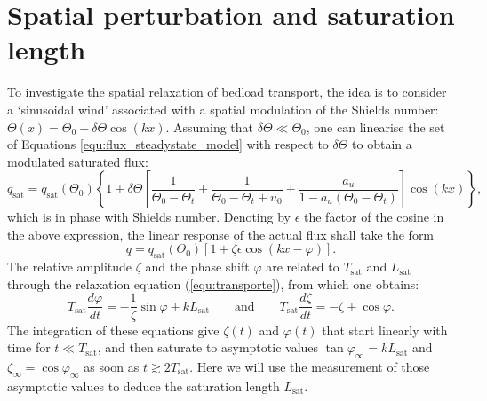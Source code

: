 \section{Spatial perturbation and saturation length}
\label{sec:Lsat}
    To investigate the spatial relaxation of bedload transport, the idea is to consider a `sinusoidal wind' associated with a spatial modulation of the Shields number: $\Theta(x) = \Theta_0 + \delta\Theta \cos (kx)$. Assuming that $\delta\Theta \ll \Theta_0$, one can linearise the set of Equations \ref{equ:flux_steadystate_model} with respect to $\delta\Theta$ to obtain a modulated saturated flux:
%
\begin{equation}
q_\textrm{sat} = q_\textrm{sat}(\Theta_0) \left\{ 1 + \delta\Theta \left[ \frac{1}{\Theta_0 - \Theta_t} + \frac{1}{\Theta_0 - \Theta_t + u_0} + \frac{a_u}{1 - a_u \left( \Theta_0 - \Theta_t \right)} \right] \cos \left( kx \right) \right\},
\label{eq:modulated_saturatedflux}
\end{equation}
%
which is in phase with Shields number. Denoting by $\epsilon$ the factor of the cosine in the above expression, the linear response of the actual flux shall take the form
%
\begin{equation}
q = q_\textrm{sat}(\Theta_0) \left[ 1 + \zeta \epsilon \cos \left( kx - \varphi \right) \right].
\label{eq:modulated_flux}
\end{equation}
%
The relative amplitude $\zeta$ and the phase shift $\varphi$ are related to $T_\textrm{sat}$ and $L_\textrm{sat}$ through the relaxation equation (\ref{equ:transporte}), from which one obtains:
%
\begin{equation}
T_\textrm{sat} \frac{d\varphi}{dt} = - \frac{1}{\zeta} \sin\varphi + kL_\textrm{sat}
\qquad \mbox{and} \qquad
T_\textrm{sat} \frac{d\zeta}{dt} = - \zeta + \cos\varphi.
\label{eq:phase_and_amplitude_evolution}
\end{equation}
%
The integration of these equations give $\zeta(t)$ and $\varphi(t)$ that start linearly with time for $t \ll T_\textrm{sat}$, and then saturate to asymptotic values $\tan\varphi_\infty = kL_\textrm{sat}$ and $\zeta_\infty = \cos\varphi_\infty$ as soon as $t \gtrsim 2 T_\textrm{sat}$. Here we will use the measurement of those asymptotic values to deduce the saturation length $L_\textrm{sat}$.

